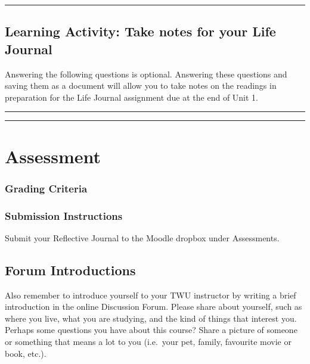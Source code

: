 \documentclass[
]{book}
\begin{document}
\begin{center}\rule{0.5\linewidth}{0.5pt}\end{center}

\hypertarget{learning-activity-take-notes-for-your-life-journal-5}{%
\subsection{Learning Activity: Take notes for your Life Journal}\label{learning-activity-take-notes-for-your-life-journal-5}}

Answering the following questions is optional. Answering these questions and saving them as a document will allow you to take notes on the readings in preparation for the Life Journal assignment due at the end of Unit 1.

\begin{center}\rule{0.5\linewidth}{0.5pt}\end{center}

\begin{center}\rule{0.5\linewidth}{0.5pt}\end{center}

\hypertarget{assessment}{%
\section{Assessment}\label{assessment}}

\hypertarget{grading-criteria}{%
\subsubsection{Grading Criteria}\label{grading-criteria}}

\hypertarget{submission-instructions}{%
\subsubsection{Submission Instructions}\label{submission-instructions}}

Submit your Reflective Journal to the Moodle dropbox under Assessments.

\hypertarget{forum-introductions}{%
\subsection{Forum Introductions}\label{forum-introductions}}

Also remember to introduce yourself to your TWU instructor by writing a brief introduction in the online Discussion Forum. Please share about yourself, such as where you live, what you are studying, and the kind of things that interest you. Perhaps some questions you have about this course? Share a picture of someone or something that means a lot to you (i.e.~your pet, family, favourite movie or book, etc.).
\end{document}
